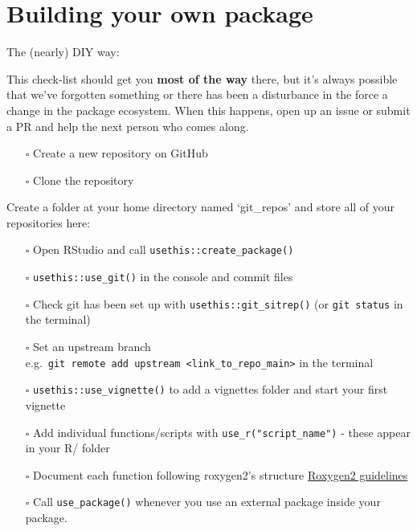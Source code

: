 \documentclass[
  letterpaper,
  DIV=11,
  numbers=noendperiod]{scrreprt}
\providecommand{\tightlist}{%
  \setlength{\itemsep}{0pt}\setlength{\parskip}{0pt}}\usepackage{longtable,booktabs,array}
\begin{document}
\section{Building your own package}\label{building-your-own-package}

The (nearly) DIY way:

This check-list should get you \textbf{most of the way} there, but it's
always possible that we've forgotten something or there has been a
disturbance in the force a change in the package ecosystem. When this
happens, open up an issue or submit a PR and help the next person who
comes along.

\begin{itemize}
\tightlist
\item[$\square$]
  Create a new repository on GitHub
\item[$\square$]
  Clone the repository
\end{itemize}

\begin{tcolorbox}[enhanced jigsaw, colback=white, opacitybacktitle=0.6, coltitle=black, left=2mm, breakable, bottomtitle=1mm, toptitle=1mm, toprule=.15mm, colframe=quarto-callout-tip-color-frame, titlerule=0mm, title=\textcolor{quarto-callout-tip-color}{\faLightbulb}\hspace{0.5em}{Folder management}, colbacktitle=quarto-callout-tip-color!10!white, rightrule=.15mm, bottomrule=.15mm, arc=.35mm, opacityback=0, leftrule=.75mm]

Create a folder at your home directory named `git\_repos' and store all
of your repositories here:

\end{tcolorbox}

\begin{itemize}
\tightlist
\item[$\square$]
  Open RStudio and call \texttt{usethis::create\_package()}
\item[$\square$]
  \texttt{usethis::use\_git()} in the console and commit files
\item[$\square$]
  Check git has been set up with \texttt{usethis::git\_sitrep()} (or
  \texttt{git\ status} in the terminal)
\item[$\square$]
  Set an upstream branch
  e.g.~\texttt{git\ remote\ add\ upstream\ \textless{}link\_to\_repo\_main\textgreater{}}
  in the terminal
\item[$\square$]
  \texttt{usethis::use\_vignette()} to add a vignettes folder and start
  your first vignette
\item[$\square$]
  Add individual functions/scripts with \texttt{use\_r("script\_name")}
  - these appear in your R/ folder
\item[$\square$]
  Document each function following roxygen2's structure
  \hyperref[roxygen2-gl]{Roxygen2 guidelines}
\item[$\square$]
  Call \texttt{use\_package()} whenever you use an external package
  inside your package.
\end{itemize}
\end{document}

